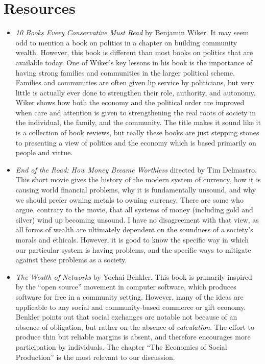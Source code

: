 \section{Resources}
\begin{itemize}
\item
\textit{10 Books Every Conservative Must Read} by Benjamin Wiker.  It may seem odd to mention a book
on politics in a chapter on building community wealth.  However, this book is different than most
books on politics that are available today.  One of Wiker's key lessons in his book is the importance
of having strong families and communities in the larger political scheme.  Families and communities 
are often given lip service by politicians, but very little is actually ever done to strengthen their
role, authority, and autonomy.  Wiker shows how both the economy and the political order are improved
when care and attention is given to strengthening the real roots of society in the individual, the
family, and the community.  The title makes it sound like it is a collection of book reviews, but really
these books are just stepping stones to presenting a view of politics and the economy which is based
primarily on people and virtue.
\enlargethispage{-\baselineskip} %
\item
\textit{End of the Road: How Money Became Worthless} directed by Tim Delmastro.  This short movie
gives the history of the modern system of currency, how it is causing world financial problems,
why it is fundamentally unsound, and why we should prefer owning metals to owning currency.  
There are some who argue, contrary to the movie, that all systems 
of money (including gold and silver) wind up becoming unsound.  I have no disagreement with that view,
as all forms of wealth are ultimately dependent on the soundness of a society's morals and ethicals.
However, it is good to know the specific way in which our particular system is having problems, and
the specific ways to mitigate against these problems as a society.
\item
\textit{The Wealth of Networks} by Yochai Benkler.  This book is primarily inspired by the ``open source'' movement
in computer software, which produces software for free in a community setting.  However, many of the ideas
are applicable to any social and community-based commerce or gift economy.  Benkler points out that social
exchanges are notable not because of an absence of obligation, but rather on the absence of \textit{calculation}.
The effort to produce thin but reliable margins is absent, and therefore encourages more participation by
individuals.  The chapter ``The Economics of Social Production'' is the most relevant to our discussion.
\end{itemize}
